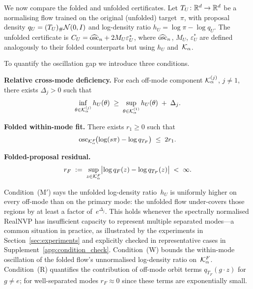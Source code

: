 We now compare the folded and unfolded certificates.
Let $T_U\colon \mathbb{R}^d \to \mathbb{R}^d$ be a normalising flow trained on the
original (unfolded) target~$\pi$, with proposal density
$q_U = (T_U)_{\#}\mathcal{N}(0,I)$ and log-density ratio
$h_U = \log\pi - \log q_U$.
The unfolded certificate is
$C_U = \widehat{\mathrm{osc}}_n + 2 M_U \varepsilon_U^*$, where
$\widehat{\mathrm{osc}}_n$, $M_U$, $\varepsilon_U^*$ are defined
analogously to their folded counterparts but using $h_U$
and~$\mathcal{K}_\alpha$.

To quantify the oscillation gap we introduce three conditions.

\begin{description}[leftmargin=1.5em,nosep]
  \item[(M\,$'$)]
  \textbf{Relative cross-mode deficiency.}
  For each off-mode component $\mathcal{K}_\alpha^{(j)}$, $j \neq 1$,
  there exists $\Delta_j > 0$ such that
  \begin{equation}\label{eq:cond_M}
    \inf_{\theta \in \mathcal{K}_\alpha^{(j)}} h_U(\theta)
    \;\geq\;
    \sup_{\theta \in \mathcal{K}_\alpha^{(1)}} h_U(\theta)
    \;+\; \Delta_j.
  \end{equation}

  \item[(W)]
  \textbf{Folded within-mode fit.}
  There exists $r_1 \geq 0$ such that
  \begin{equation}\label{eq:cond_W}
    \mathrm{osc}_{\mathcal{K}_\alpha^F}\!\bigl(\log(s\pi) - \log q_{T_F}\bigr)
    \;\leq\; 2r_1.
  \end{equation}

  \item[(R)]
  \textbf{Folded-proposal residual.}
  \begin{equation}\label{eq:cond_R}
    r_F \;:=\;
    \sup_{z \in \mathcal{K}_\alpha^F}
    \bigl|\log q_F(z) - \log q_{T_F}(z)\bigr|
    \;<\; \infty.
  \end{equation}
\end{description}

\noindent
Condition~(M$'$) says the unfolded log-density ratio~$h_U$ is
uniformly higher on every off-mode than on the primary mode: the
unfolded flow under-covers those regions by at least a factor
of~$e^{\Delta_j}$.  This holds whenever the spectrally normalised
RealNVP has insufficient capacity to represent multiple separated
modes---a common situation in practice, as illustrated by the experiments
in Section~\ref{sec:experiments} and explicitly checked in
representative cases in Supplement~\ref{app:condition_check}.
Condition~(W) bounds the within-mode oscillation of the folded
flow's unnormalised log-density ratio on~$\mathcal{K}_\alpha^F$.
Condition~(R) quantifies the contribution of off-mode orbit
terms $q_{T_F}(g \cdot z)$ for $g \neq e$; for well-separated
modes $r_F \approx 0$ since these terms are exponentially small.

